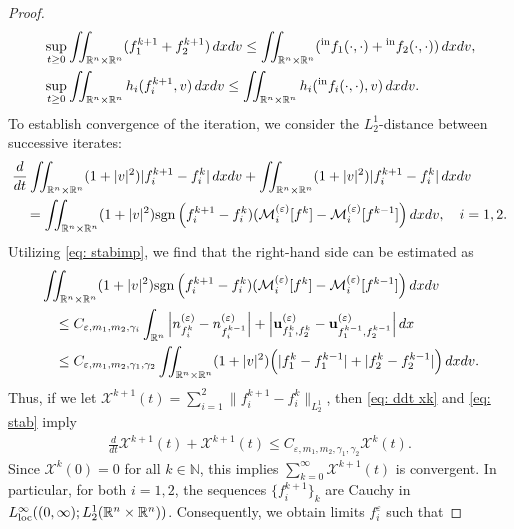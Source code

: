 \documentclass[10pt,reqno]{amsart}
\numberwithin{equation}{section}
\newcommand{\R}{\mathbb R}
\newcommand{\lt}{\left}
\newcommand{\rt}{\right}
\newcommand{\calX}{\mathcal X}
\newcommand{\calM}{\mathcal M}
\newcommand{\ve}{\varepsilon}
\begin{document}
\begin{proof}
\begin{equation}
\begin{split}
    &\sup_{t\ge 0} \iint_{\R^n \times \R^n} (f_1^{k+1} + f_2^{k+1})\, dxdv \le \iint_{\R^n \times \R^n} ({}^{\rm in}f_1(\cdot,\cdot)+{}^{\rm in}f_2(\cdot,\cdot))\, dxdv,\\
    &\sup_{t\ge 0} \iint_{\R^n \times \R^n} h_i(f_i^{k+1},v)\, dxdv \le \iint_{\R^n \times \R^n} h_i({}^{\rm in}f_i(\cdot,\cdot),v)\, dxdv.
    \end{split}
\end{equation}
To establish convergence of the iteration, we consider the $L^1_2$-distance between successive iterates:
\begin{equation}\label{eq: ddt xk}
\begin{split}
    &\frac{d}{dt}\iint_{\R^n \times \R^n} (1+|v|^2)|f^{k+1}_i - f^k_i|\,dxdv + \iint_{\R^n \times \R^n} (1+|v|^2)|f^{k+1}_i - f^k_i|\,dxdv \\
    &\quad = \iint_{\R^n \times \R^n} (1+|v|^2)\textnormal{sgn}\lt(f^{k+1}_i - f^k_i) (\calM^{(\ve)}_i [f^k] - \calM^{(\ve)}_i [f^{k-1}]\rt) dxdv,\quad i=1,2.
\end{split}
\end{equation}
Utilizing \eqref{eq: stabimp}, we find that the right-hand side can be estimated as
\begin{equation} \label{eq: stab}
\begin{split}
    &\iint_{\R^n \times \R^n} (1+|v|^2)\textnormal{sgn}\lt(f^{k+1}_i - f^k_i) (\calM^{(\ve)}_i [f^k] - \calM^{(\ve)}_i [f^{k-1}] \rt) dxdv\\
    &\quad \le C_{\ve,m_1,m_2,\gamma_i} \int_{\R^n} \left|n_{f_i^{k}}^{(\ve)} - n_{f_i^{k-1}}^{(\ve)} \right| + \left|{\bf{u}}^{(\ve)}_{f_1^{k},f_2^k} - {\bf{u}}^{(\ve)}_{f_1^{k-1}, f_2^{k-1}}\right| dx\\
    &\quad \le C_{\ve,m_1,m_2,\gamma_1,\gamma_2} \iint_{\R^n \times \R^n} (1+|v|^2)\Big(|f_1^k - f_1^{k-1}| + |f_2^k - f_2^{k-1}| \Big)\, dxdv.
\end{split}
\end{equation}
Thus, if we let $\calX^{k+1}(t) = \sum_{i=1}^2 \|f_i^{k+1} - f_i^k\|_{L^1_2}$, then \eqref{eq: ddt xk} and \eqref{eq: stab} imply
\begin{align*}
    \frac{d}{dt}\calX^{k+1}(t) + \calX^{k+1}(t) \le C_{\ve,m_1,m_2,\gamma_1,\gamma_2}\calX^k(t).
\end{align*}
Since $\calX^k(0) = 0$ for all $k\in \mathbb N$, this implies $\sum_{k=0}^\infty \calX^{k+1}(t)$ is convergent. In particular, for both $i=1,2$, the sequences $\{f_i^{k+1}\}_k$ are Cauchy in $L^\infty_{\rm loc}((0,\infty);L^1_2(\R^n \times \R^n))$. Consequently, we obtain limits $f_i^\ve$ such that 

\end{proof}
\end{document}
